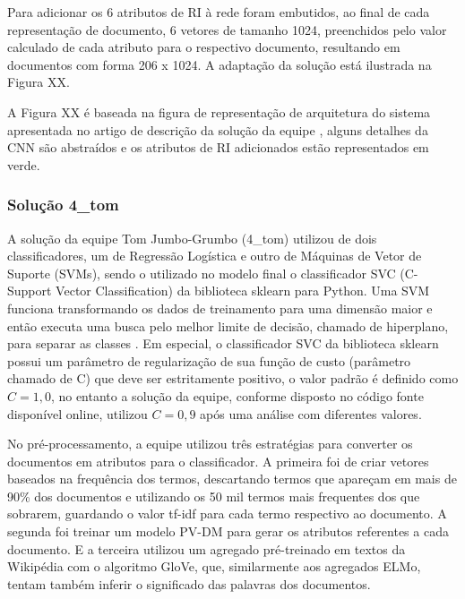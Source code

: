 				Para adicionar os 6 atributos de RI à rede foram embutidos, ao final de cada representação de documento, 6 vetores de tamanho 1024, preenchidos pelo valor calculado de cada atributo para o respectivo documento, resultando em documentos com forma 206 x 1024.
				A adaptação da solução está ilustrada na Figura XX.
				

				A Figura XX é baseada na figura de representação de arquitetura do sistema apresentada no artigo de descrição da solução da equipe \cite{jiang-etal-2019-team}, alguns detalhes da CNN são abstraídos e os atributos de RI adicionados estão representados em verde.


			\subsubsection{Solução 4\_tom}
				A solução da equipe Tom Jumbo-Grumbo (4\_tom) utilizou de dois classificadores, um de Regressão Logística e outro de Máquinas de Vetor de Suporte (SVMs), sendo o utilizado no modelo final o classificador SVC (C-Support Vector Classification) da biblioteca sklearn para Python.
				Uma SVM funciona transformando os dados de treinamento para uma dimensão maior e então executa uma busca pelo melhor limite de decisão, chamado de hiperplano, para separar as classes \cite[p.~408]{Han:2011:DMC:1972541}.
				Em especial, o classificador SVC da biblioteca sklearn possui um parâmetro de regularização de sua função de custo (parâmetro chamado de C) que deve ser estritamente positivo, o valor padrão é definido como $C = 1,0$, no entanto a solução da equipe, conforme disposto no código fonte disponível online, utilizou $C = 0,9$ após uma análise com diferentes valores.

				No pré-processamento, a equipe utilizou três estratégias para converter os documentos em atributos para o classificador.
				A primeira foi de criar vetores baseados na frequência dos termos, descartando termos que apareçam em mais de 90\% dos documentos e utilizando os 50 mil termos mais frequentes dos que sobrarem, guardando o valor tf-idf para cada termo respectivo ao documento.
				A segunda foi treinar um modelo PV-DM para gerar os atributos referentes a cada documento.
				E a terceira utilizou um agregado pré-treinado em textos da Wikipédia com o algoritmo GloVe, que, similarmente aos agregados ELMo, tentam também inferir o significado das palavras dos documentos.

